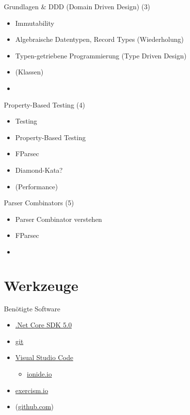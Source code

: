 \documentclass[t]{beamer}
\begin{document}
\begin{frame}[label={sec:org1dc0cf9}]{Grundlagen \& DDD (Domain Driven Design) (3)}
\begin{itemize}
\item Immutability
\item Algebraische Datentypen, Record Types (Wiederholung)
\item Typen-getriebene Programmierung (Type Driven Design)
\item (Klassen)
\item\relax [Programmieraufgabe!]
\end{itemize}
\end{frame}

\begin{frame}[label={sec:orga2f0434}]{Property-Based Testing (4)}
\begin{itemize}
\item Testing
\item Property-Based Testing
\item FParsec
\item Diamond-Kata?
\item (Performance)
\end{itemize}
\end{frame}

\begin{frame}[label={sec:orgcfd99a7}]{Parser Combinators (5)}
\begin{itemize}
\item Parser Combinator verstehen
\item FParsec
\item\relax [Test!]
\end{itemize}
\end{frame}


\section{Werkzeuge }
\label{sec:org73b237a}

\begin{frame}[label={sec:org2642549}]{Benötigte Software}
\begin{itemize}
\item \href{https://dotnet.microsoft.com/download}{.Net Core SDK 5.0}
\item \href{https://git-scm.com/}{git}
\item \href{https://code.visualstudio.com/}{Visual Studio Code}
\begin{itemize}
\item \href{http://ionide.io/}{ionide.io}
\end{itemize}
\item \href{https://exercism.io/}{exercism.io}
\item (\href{https://github.com/}{github.com})
\end{itemize}
\end{frame}
\end{document}
